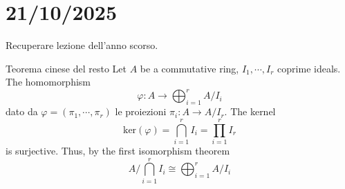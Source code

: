 \documentclass[a4paper]{article}
\begin{document}
\pagebreak

\section{21/10/2025}

Recuperare lezione dell'anno scorso.

\begin{snippettheorem}{Teorema cinese del resto}
    Let \(A\) be a commutative ring, \(I_1, \cdots, I_r\)
    coprime ideals. The homomorphism
    \[
        \varphi\colon A \to \bigoplus_{i=1}^r A/I_i
    \]
    dato da \(\varphi = (\pi_1, \cdots, \pi_r)\)
    le proiezioni \(\pi_i \colon A \to A/I_r\).
    The kernel
    \[
        \text{ker}(\varphi) = \bigcap_{i=1}^r I_i = \prod_{i=1}^r I_r
    \]
    is surjective. Thus, by the first isomorphism theorem
    \[
        A / \bigcap_{i=1}^r I_i \cong \bigoplus_{i=1}^r A/I_i
    \]
\end{snippettheorem}
\end{document}
